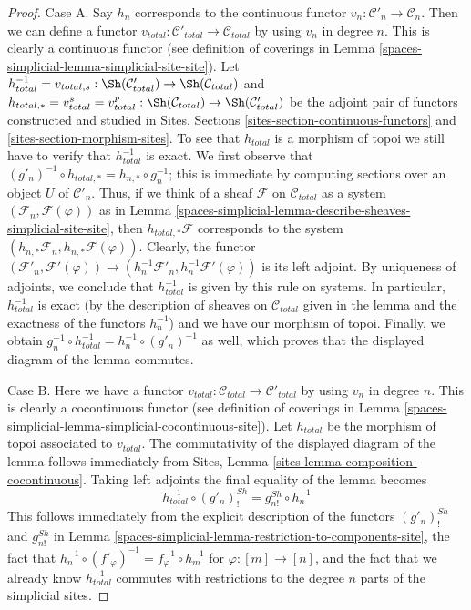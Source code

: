\begin{proof}
Case A. Say $h_n$ corresponds to the continuous functor
$v_n : \mathcal{C}'_n \to \mathcal{C}_n$. Then we can define
a functor $v_{total} : \mathcal{C}'_{total} \to \mathcal{C}_{total}$
by using $v_n$ in degree $n$. This is clearly a continuous functor
(see definition of coverings in Lemma \ref{spaces-simplicial-lemma-simplicial-site-site}).
Let
$h_{total}^{-1} = v_{total, s} :
\Sh(\mathcal{C}'_{total}) \to \Sh(\mathcal{C}_{total})$ and
$h_{total, *} = v_{total}^s = v_{total}^p :
\Sh(\mathcal{C}_{total}) \to \Sh(\mathcal{C}'_{total})$
be the adjoint pair of functors constructed and studied in
Sites, Sections \ref{sites-section-continuous-functors} and
\ref{sites-section-morphism-sites}.
To see that $h_{total}$ is a morphism of topoi
we still have to verify that $h_{total}^{-1}$ is exact.
We first observe that
$(g'_n)^{-1} \circ h_{total, *} = h_{n, *} \circ g_n^{-1}$;
this is immediate by computing sections over an object $U$
of $\mathcal{C}'_n$. Thus, if we think of a sheaf $\mathcal{F}$
on $\mathcal{C}_{total}$ as a system $(\mathcal{F}_n, \mathcal{F}(\varphi))$
as in Lemma \ref{spaces-simplicial-lemma-describe-sheaves-simplicial-site-site}, then
$h_{total, *}\mathcal{F}$ corresponds to
the system $(h_{n, *}\mathcal{F}_n, h_{n, *}\mathcal{F}(\varphi))$.
Clearly, the functor
$(\mathcal{F}'_n, \mathcal{F}'(\varphi)) \to
(h_n^{-1}\mathcal{F}'_n, h_n^{-1}\mathcal{F}'(\varphi))$
is its left adjoint. By uniqueness of adjoints, we conclude that
$h_{total}^{-1}$ is given by this rule on systems. In particular,
$h_{total}^{-1}$ is exact (by the description of sheaves on
$\mathcal{C}_{total}$ given in the lemma and the exactness of
the functors $h_n^{-1}$) and we have our morphism of topoi.
Finally, we obtain $g_n^{-1} \circ h_{total}^{-1} =
h_n^{-1} \circ (g'_n)^{-1}$ as well, which proves that the
displayed diagram of the lemma commutes.

\medskip\noindent
Case B. Here we have a functor
$v_{total} : \mathcal{C}_{total} \to \mathcal{C}'_{total}$
by using $v_n$ in degree $n$. This is clearly a cocontinuous functor
(see definition of coverings in Lemma \ref{spaces-simplicial-lemma-simplicial-cocontinuous-site}).
Let $h_{total}$ be the morphism of topoi associated to $v_{total}$.
The commutativity of the displayed diagram of the lemma follows
immediately from Sites, Lemma \ref{sites-lemma-composition-cocontinuous}.
Taking left adjoints the final equality of the lemma becomes
$$
h_{total}^{-1} \circ (g'_n)^{Sh}_! = g^{Sh}_{n!} \circ h_n^{-1}
$$
This follows immediately from the explicit description of the functors
$(g'_n)^{Sh}_!$ and $g^{Sh}_{n!}$ in
Lemma \ref{spaces-simplicial-lemma-restriction-to-components-site},
the fact that $h_n^{-1} \circ (f'_\varphi)^{-1} =
f_\varphi^{-1} \circ h_m^{-1}$ for $\varphi : [m] \to [n]$, and
the fact that we already know $h_{total}^{-1}$ commutes
with restrictions to the degree $n$ parts of the simplicial sites.
\end{proof}

